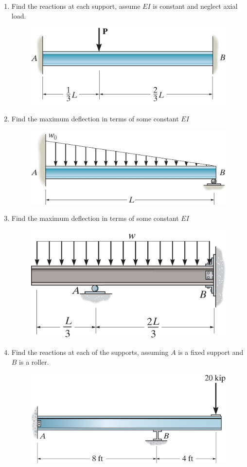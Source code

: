 \documentclass[12pt, oneside]{article}
\begin{document}
\begin{enumerate}
	\item %
		Find the reactions at each support, assume $EI$ is constant and neglect axial load.
		\begin{figure}[H]
			\centering
			\includegraphics[width=0.6\linewidth]{12-99}
		\end{figure}

	\item %
		Find the maximum deflection in terms of some constant $EI$
		\begin{figure}[H]
			\centering
			\includegraphics[width=0.6\linewidth]{12-106}
		\end{figure}

	\item %
		Find the maximum deflection in terms of some constant $EI$
		\begin{figure}[H]
			\centering
			\includegraphics[width=0.6\linewidth]{12-107}
		\end{figure}
		\newpage

	\item %
		Find the reactions at each of the supports, assuming $A$ is a fixed support and $B$ is a roller.
		\begin{figure}[H]
			\centering
			\includegraphics[width=0.6\linewidth]{12-121}
		\end{figure}


\end{enumerate}
\end{document}
